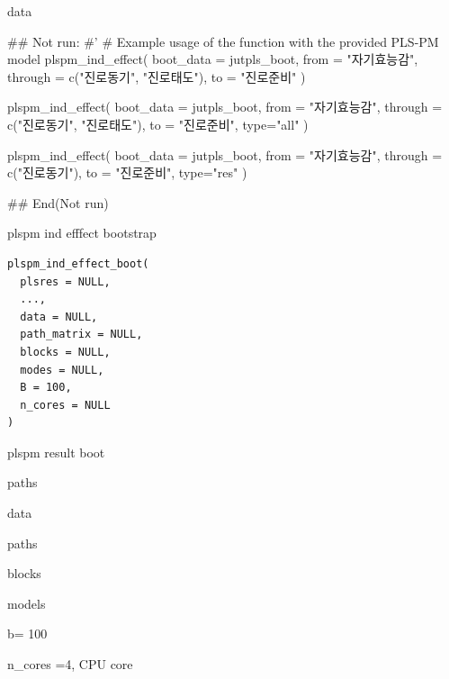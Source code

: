 \documentclass[a4paper]{book}
\begin{document}
%
\begin{Value}
data
\end{Value}
%
\begin{Examples}
\begin{ExampleCode}

## Not run: 
#'
# Example usage of the function with the provided PLS-PM model
plspm_ind_effect(
  boot_data = jutpls_boot,
  from = "자기효능감",
  through = c("진로동기", "진로태도"),
  to = "진로준비"
)

plspm_ind_effect(
  boot_data = jutpls_boot,
  from = "자기효능감",
  through = c("진로동기", "진로태도"),
  to = "진로준비", type="all"
)

plspm_ind_effect(
  boot_data = jutpls_boot,
  from = "자기효능감",
  through = c("진로동기"),
  to = "진로준비", type="res"
)


## End(Not run)


\end{ExampleCode}
\end{Examples}
%
\begin{Description}
plspm ind efffect bootstrap
\end{Description}
%
\begin{Usage}
\begin{verbatim}
plspm_ind_effect_boot(
  plsres = NULL,
  ...,
  data = NULL,
  path_matrix = NULL,
  blocks = NULL,
  modes = NULL,
  B = 100,
  n_cores = NULL
)
\end{verbatim}
\end{Usage}
%
\begin{Arguments}
\begin{ldescription}
\item[\code{plsres}] plspm result boot

\item[\code{...}] paths

\item[\code{data}] data

\item[\code{path\_matrix}] paths

\item[\code{blocks}] blocks

\item[\code{modes}] models

\item[\code{B}] b= 100

\item[\code{n\_cores}] n\_cores =4, CPU core
\end{ldescription}
\end{Arguments}
\end{document}
